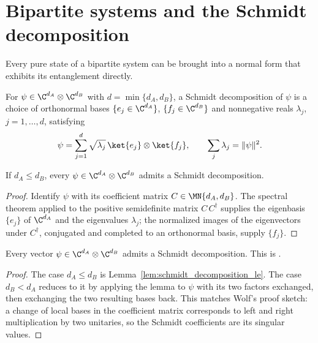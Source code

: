 \section{Bipartite systems and the Schmidt decomposition}

Every pure state of a bipartite system can be brought into a normal form
that exhibits its entanglement directly.

\begin{definition}\label{def:schmidt_decomposition}
    \leanok
    For $\psi\in\C^{d_A}\otimes\C^{d_B}$ with $d=\min\{d_A,d_B\}$, a Schmidt
    decomposition of $\psi$ is a choice of orthonormal bases
    $\{e_j\in\C^{d_A}\}$, $\{f_j\in\C^{d_B}\}$ and nonnegative reals
    $\lambda_j$, $j=1,\ldots,d$, satisfying
    \[
        \psi=\sum_{j=1}^d \sqrt{\lambda_j}\,\ket{e_j}\otimes\ket{f_j},
        \qquad
        \sum_j \lambda_j = \|\psi\|^2.
    \]
\end{definition}

\begin{lemma}
    \label{lem:schmidt_decomposition_le}
    \leanok
    If $d_A\le d_B$, every $\psi\in\C^{d_A}\otimes\C^{d_B}$ admits a Schmidt
    decomposition.
\end{lemma}

\begin{proof}\leanok
    Identify $\psi$ with its coefficient matrix $C\in \MN{d_A,d_B}$. The
    spectral theorem applied to the positive semidefinite matrix $C\,C^\dagger$
    supplies the eigenbasis $\{e_j\}$ of $\C^{d_A}$ and the eigenvalues
    $\lambda_j$; the normalized images of the eigenvectors under $C^\dagger$,
    conjugated and completed to an orthonormal basis, supply $\{f_j\}$.
\end{proof}

\begin{proposition}\label{prop:schmidt_decomposition}
    \leanok
    Every vector $\psi\in\C^{d_A}\otimes\C^{d_B}$ admits a Schmidt
    decomposition. This is \cite[Proposition~1.1]{Wolf2012Quantum}.
\end{proposition}

\begin{proof}\leanok
    The case $d_A\le d_B$ is Lemma~\ref{lem:schmidt_decomposition_le}. The
    case $d_B<d_A$ reduces to it by applying the lemma to $\psi$ with its two
    factors exchanged, then exchanging the two resulting bases back. This
    matches Wolf's proof sketch: a change of local bases in the coefficient
    matrix corresponds to left and right multiplication by two unitaries, so
    the Schmidt coefficients are its singular values.
\end{proof}

